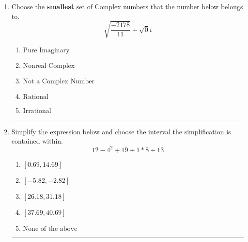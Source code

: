 \documentclass[14pt]{extbook}
\newcommand{\litem}[1]{\item#1\hspace*{-1cm}\rule{\textwidth}{0.4pt}}
\begin{document}
\begin{enumerate}
{\begin{enumerate}[label=\Alph*.]
\end{enumerate} }
\litem{
Choose the \textbf{smallest} set of Complex numbers that the number below belongs to.\[ \sqrt{\frac{-2178}{11}}+\sqrt{0}i \]\begin{enumerate}[label=\Alph*.]
\item \( \text{Pure Imaginary} \)
\item \( \text{Nonreal Complex} \)
\item \( \text{Not a Complex Number} \)
\item \( \text{Rational} \)
\item \( \text{Irrational} \)

\end{enumerate} }
\litem{
Simplify the expression below and choose the interval the simplification is contained within.\[ 12 - 4^2 + 19 \div 1 * 8 \div 13 \]\begin{enumerate}[label=\Alph*.]
\item \( [0.69, 14.69] \)
\item \( [-5.82, -2.82] \)
\item \( [26.18, 31.18] \)
\item \( [37.69, 40.69] \)
\item \( \text{None of the above} \)

\end{enumerate} }
\end{enumerate}
\end{document}
